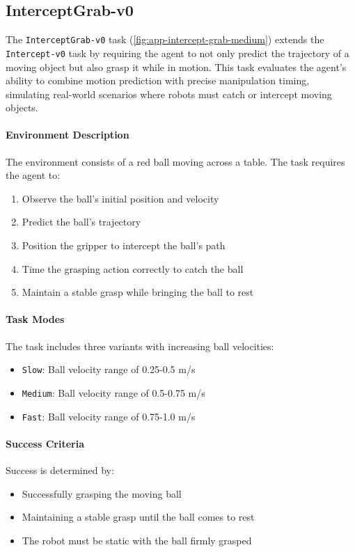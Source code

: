 \subsection{InterceptGrab-v0}
\label{app:intercept-grab}

The \texttt{InterceptGrab-v0} task (\autoref{fig:app-intercept-grab-medium}) extends the \texttt{Intercept-v0} task by requiring the agent to not only predict the trajectory of a moving object but also grasp it while in motion. This task evaluates the agent's ability to combine motion prediction with precise manipulation timing, simulating real-world scenarios where robots must catch or intercept moving objects.

\paragraph{Environment Description} The environment consists of a red ball moving across a table. The task requires the agent to:
\begin{enumerate}
    \item Observe the ball's initial position and velocity
    \item Predict the ball's trajectory
    \item Position the gripper to intercept the ball's path
    \item Time the grasping action correctly to catch the ball
    \item Maintain a stable grasp while bringing the ball to rest
\end{enumerate}

\paragraph{Task Modes} The task includes three variants with increasing ball velocities:
\begin{itemize}
    \item \texttt{Slow}: Ball velocity range of 0.25-0.5 m/s
    \item \texttt{Medium}: Ball velocity range of 0.5-0.75 m/s
    \item \texttt{Fast}: Ball velocity range of 0.75-1.0 m/s
\end{itemize}

\paragraph{Success Criteria} Success is determined by:
\begin{itemize}
    \item Successfully grasping the moving ball
    \item Maintaining a stable grasp until the ball comes to rest
    \item The robot must be static with the ball firmly grasped
\end{itemize}

